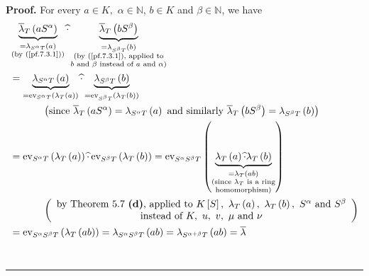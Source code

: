 \documentclass[numbers=enddot,12pt,final,onecolumn,notitlepage]{scrartcl}%
\newenvironment{proof}[1][Proof]{\noindent\textbf{#1.} }{\ \rule{0.5em}{0.5em}}
\begin{document}
\begin{proof}
For every $a\in K,$ $\alpha\in\mathbb{N}$, $b\in K$ and $\beta\in\mathbb{N}$,
we have%
\begin{align*}
&  \underbrace{\overline{\lambda}_{T}\left(  aS^{\alpha}\right)
}_{\substack{=\lambda_{S^{\alpha}T}\left(  a\right)  \\\text{(by
(\ref{pf.7.3.1}))}}}\widehat{\cdot}\underbrace{\overline{\lambda}_{T}\left(
bS^{\beta}\right)  }_{\substack{=\lambda_{S^{\beta}T}\left(  b\right)
\\\text{(by (\ref{pf.7.3.1}), applied to}\\b\text{ and }\beta\text{ instead of
}a\text{ and }\alpha\text{)}}}\\
&  =\underbrace{\lambda_{S^{\alpha}T}\left(  a\right)  }_{=\operatorname*{ev}%
\nolimits_{S^{\alpha}T}\left(  \lambda_{T}\left(  a\right)  \right)
}\widehat{\cdot}\underbrace{\lambda_{S^{\beta}T}\left(  b\right)
}_{=\operatorname*{ev}\nolimits_{S^{\beta}T}\left(  \lambda_{T}\left(
b\right)  \right)  }\\
&  \ \ \ \ \ \ \ \ \ \ \left(  \text{since }\overline{\lambda}_{T}\left(
aS^{\alpha}\right)  =\lambda_{S^{\alpha}T}\left(  a\right)  \text{ and
similarly }\overline{\lambda}_{T}\left(  bS^{\beta}\right)  =\lambda
_{S^{\beta}T}\left(  b\right)  \right) \\
&  =\operatorname*{ev}\nolimits_{S^{\alpha}T}\left(  \lambda_{T}\left(
a\right)  \right)  \widehat{\cdot}\operatorname*{ev}\nolimits_{S^{\beta}%
T}\left(  \lambda_{T}\left(  b\right)  \right)  =\operatorname*{ev}%
\nolimits_{S^{\alpha}S^{\beta}T}\left(  \underbrace{\lambda_{T}\left(
a\right)  \widehat{\cdot}\lambda_{T}\left(  b\right)  }_{\substack{=\lambda
_{T}\left(  ab\right)  \\\text{(since }\lambda_{T}\text{ is a ring}%
\\\text{homomorphism)}}}\right) \\
&  \ \ \ \ \ \ \ \ \ \ \left(
\begin{array}
[c]{c}%
\text{by Theorem 5.7 \textbf{(d)}, applied to }K\left[  S\right]  ,\text{
}\lambda_{T}\left(  a\right)  ,\text{ }\lambda_{T}\left(  b\right)  ,\text{
}S^{\alpha}\text{ and }S^{\beta}\\
\text{instead of }K,\text{ }u,\text{ }v,\text{ }\mu\text{ and }\nu
\end{array}
\right) \\
&  =\operatorname*{ev}\nolimits_{S^{\alpha}S^{\beta}T}\left(  \lambda
_{T}\left(  ab\right)  \right)  =\lambda_{S^{\alpha}S^{\beta}T}\left(
ab\right)  =\lambda_{S^{\alpha+\beta}T}\left(  ab\right)  =\overline{\lambda
}
\end{align*}
\end{proof}
\end{document}
